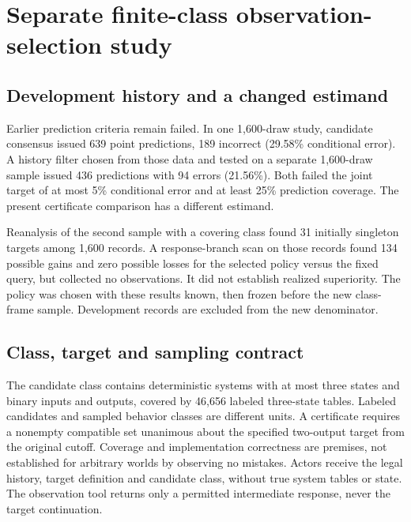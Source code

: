 \section{Separate finite-class observation-selection study}
\label{app:observation-selection}

\subsection{Development history and a changed estimand}

Earlier prediction criteria remain failed. In one 1,600-draw study,
candidate consensus issued 639 point predictions, 189 incorrect
(29.58\% conditional error). A history filter chosen from those data
and tested on a separate 1,600-draw sample issued 436 predictions with
94 errors (21.56\%). Both failed the joint target of at most 5\%
conditional error and at least 25\% prediction coverage. The present
certificate comparison has a different estimand.

Reanalysis of the second sample with a covering class found 31 initially
singleton targets among 1,600 records. A response-branch scan on those
records found 134 possible gains and zero possible losses for the
selected policy versus the fixed query, but collected no observations.
It did not establish realized superiority. The policy was chosen with
these results known, then frozen before the new class-frame sample.
Development records are excluded from the new denominator.

\subsection{Class, target and sampling contract}

The candidate class contains deterministic systems with at most three
states and binary inputs and outputs, covered by 46,656 labeled
three-state tables. Labeled candidates and sampled behavior classes
are different units. A certificate requires a nonempty compatible set
unanimous about the specified two-output target from the original
cutoff. Coverage and implementation correctness are premises, not
established for arbitrary worlds by observing no mistakes. Actors receive
the legal history, target definition and candidate class, without true
system tables or state. The observation tool returns only a permitted
intermediate response, never the target continuation.

